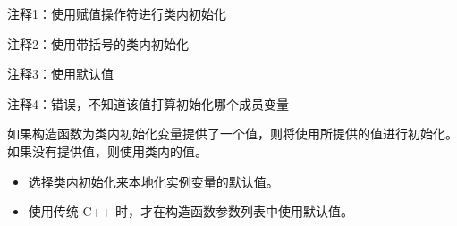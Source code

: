 {\footnotesize
注释1：使用赋值操作符进行类内初始化

注释2：使用带括号的类内初始化

注释3：使用默认值

注释4：错误，不知道该值打算初始化哪个成员变量
}

如果构造函数为类内初始化变量提供了一个值，则将使用所提供的值进行初始化。如果没有提供值，则使用类内的值。


\begin{itemize}
\item
选择类内初始化来本地化实例变量的默认值。

\item
使用传统 C++ 时，才在构造函数参数列表中使用默认值。
\end{itemize}
